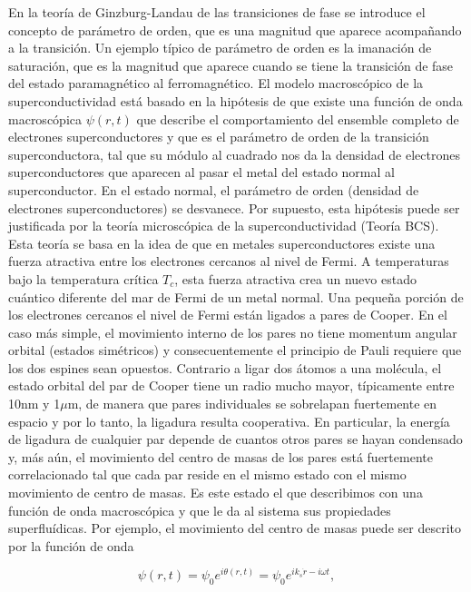 En la teoría de Ginzburg-Landau \cite{cyrot} de las transiciones de fase se introduce el concepto de parámetro de orden, que es una magnitud que aparece acompañando a la transición. Un ejemplo típico de parámetro de orden es la imanación de saturación, que es la magnitud que aparece cuando se tiene la transición de fase del estado paramagnético al ferromagnético. El modelo macroscópico de la superconductividad está basado en la hipótesis de que existe una función de onda macroscópica $\psi(r,t)$ que describe el comportamiento del ensemble completo de electrones superconductores y que es el parámetro de orden de la transición superconductora, tal que su módulo al cuadrado nos da la densidad de electrones superconductores que aparecen al pasar el metal del estado normal al superconductor. En el estado normal, el parámetro de orden (densidad de electrones superconductores) se desvanece. Por supuesto, esta hipótesis puede ser justificada por la teoría microscópica de la superconductividad (Teoría BCS). Esta teoría se basa en la idea de que en metales superconductores existe una fuerza atractiva entre los electrones cercanos al nivel de Fermi. A temperaturas bajo la temperatura crítica $T_c$, esta fuerza atractiva crea un nuevo estado cuántico diferente del mar de Fermi de un metal normal. Una pequeña porción de los electrones cercanos el nivel de Fermi están ligados a pares de Cooper. En el caso más simple, el movimiento interno de los pares no tiene momentum angular orbital (estados simétricos) y consecuentemente el principio de Pauli requiere que los dos espines sean opuestos. Contrario a ligar dos átomos a una molécula, el estado orbital del par de Cooper tiene un radio mucho mayor, típicamente entre 10nm y 1$\mu$m, de manera que pares individuales se sobrelapan fuertemente en espacio y por lo tanto, la ligadura resulta cooperativa. En particular, la energía de ligadura de cualquier par depende de cuantos otros pares se hayan condensado y, más aún, el movimiento del centro de masas de los pares está fuertemente correlacionado tal que cada par reside en el mismo estado con el mismo movimiento de centro de masas. Es este estado el que describimos con una función de onda macroscópica y que le da al sistema sus propiedades superfluídicas. Por ejemplo, el movimiento del centro de masas puede ser descrito por la función de onda

\begin{equation}
    \psi(r,t) = \psi_0 e^{i \theta(r,t)} = \psi_0 e^{i k_s \dot r - i \omega t} ,
\end{equation}

